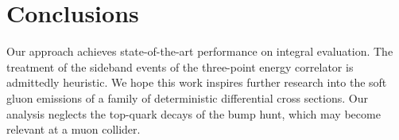 \section{Conclusions}\label{sec:conclusions}

Our approach achieves state-of-the-art performance on integral
evaluation. The treatment of the sideband events of the three-point
energy correlator is admittedly heuristic. We hope this work inspires
further research into the soft gluon emissions of a family of
deterministic differential cross sections. Our analysis neglects the
top-quark decays of the bump hunt, which may become relevant at a muon
collider.

